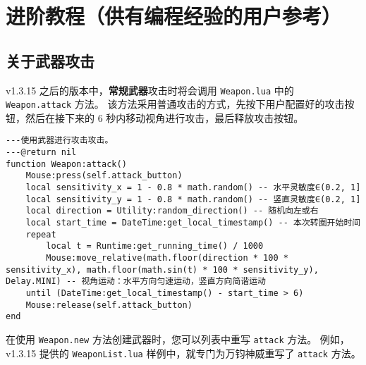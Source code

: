 \section{进阶教程（供有编程经验的用户参考）}
\label{section_advanced_usage}

\subsection{关于武器攻击}

v1.3.15 之后的版本中，\textbf{常规武器}攻击时将会调用 \lstinline{Weapon.lua} 中的 \lstinline{Weapon.attack} 方法。
该方法采用普通攻击的方式，先按下用户配置好的攻击按钮，然后在接下来的 6 秒内移动视角进行攻击，最后释放攻击按钮。

\begin{verbatim}
---使用武器进行攻击攻击。
---@return nil
function Weapon:attack()
    Mouse:press(self.attack_button)
    local sensitivity_x = 1 - 0.8 * math.random() -- 水平灵敏度∈(0.2, 1]
    local sensitivity_y = 1 - 0.8 * math.random() -- 竖直灵敏度∈(0.2, 1]
    local direction = Utility:random_direction() -- 随机向左或右
    local start_time = DateTime:get_local_timestamp() -- 本次转圈开始时间
    repeat
        local t = Runtime:get_running_time() / 1000
        Mouse:move_relative(math.floor(direction * 100 * sensitivity_x), math.floor(math.sin(t) * 100 * sensitivity_y), Delay.MINI) -- 视角运动：水平方向匀速运动，竖直方向简谐运动
    until (DateTime:get_local_timestamp() - start_time > 6)
    Mouse:release(self.attack_button)
end
\end{verbatim}

在使用 \lstinline{Weapon.new} 方法创建武器时，您可以列表中重写 \lstinline{attack} 方法。
例如，v1.3.15 提供的 \lstinline{WeaponList.lua} 样例中，就专门为万钧神威重写了 \lstinline{attack} 方法。

